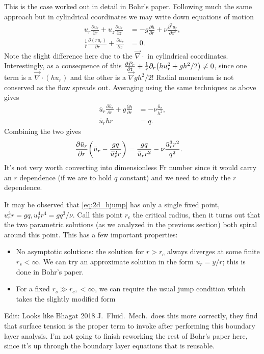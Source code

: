 \documentclass[11pt,
        usenames, %
        dvipsnames %
    ]{report}
\newcommand*{\pd}[2]{\frac{\partial#1}{\partial#2}}
\newcommand*{\ptd}[2]{\frac{\partial^2 #1}{\partial#2^2}}
\DeclarePairedDelimiter\p{\lparen}{\rparen}
\begin{document}
This is the case worked out in detail in Bohr's paper. Following much the same
approach but in cylindrical coordinates we may write down equations of motion
\begin{align}
    u_r \pd{u_r}{r} + u_z \pd{u_r}{z} &= -g\pd{h}{r} + \nu
        \ptd{u_r}{z},\nonumber\\
    \frac{1}{r}\pd{(ru_r)}{r} + \pd{u_z}{z} &= 0.
\end{align}
Note the slight difference here due to the $\vec{\nabla} \cdot$ in cylindrical
coordinates. Interestingly, as a consequence of this $\pd{P_r}{t} +
\frac{1}{r}\partial_r \p*{hu_r^2 + gh^2/2} \neq 0$, since one term is a
$\vec{\nabla} \cdot (hu_r)$ and the other is a $\vec{\nabla}gh^2/2$! Radial
momentum is not conserved as the flow spreads out. Averaging using the same
techniques as above gives
\begin{align}
    \bar{u}_r\pd{\bar{u}_r}{r} + g\pd{h}{r} &= -\nu \frac{\bar{u}_r}{h^2},\nonumber\\
    \bar{u}_rhr &= q.
\end{align}
Combining the two gives
\begin{align}
    \pd{\bar{u}_r}{r}\p*{\bar{u}_r - \frac{gq}{\bar{u}_r^2r}}
        &= \frac{gq}{\bar{u}_rr^2} - \nu\frac{\bar{u}_r^3r^2}{q^2}.
        \label{eq:2d_hjump}
\end{align}
It's not very worth converting into dimensionless $\mathrm{Fr}$ number since it
would carry an $r$ dependence (if we are to hold $q$ constant) and we need to
study the $r$ dependence.

It may be observed that \autoref{eq:2d_hjump} has only a single fixed point,
$u_r^3r = gq, u_r^4r^4 = gq^3/\nu$. Call this point $r_c$ the critical radius,
then it turns out that the two parametric solutions (as we analyzed in the
previous section) both spiral around this point. This has a few important
properties:
\begin{itemize}
    \item No asymptotic solutions: the solution for $r > r_c$ always diverges
        at some finite $r_s < \infty$. We can try an approximate solution in the
        form $u_r = y / r$; this is done in Bohr's paper.

    \item For a fixed $r_s \gg r_c, < \infty$, we can require the usual jump
        condition which takes the slightly modified form
\end{itemize}

Edit: Looks like Bhagat 2018 J.\ Fluid.\ Mech.\ does this more correctly, they
find that surface tension is the proper term to invoke after performing this
boundary layer analysis. I'm not going to finish reworking the rest of Bohr's
paper here, since it's up through the boundary layer equations that is reusable.
\end{document}
